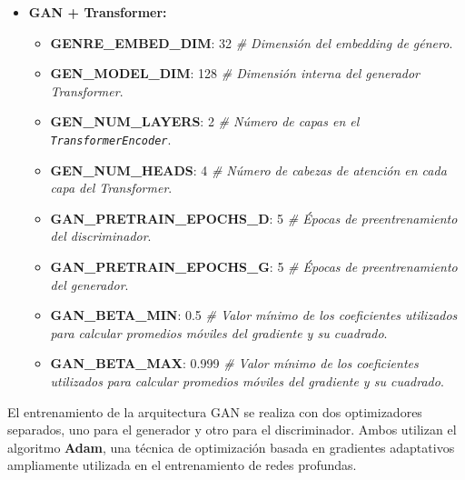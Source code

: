 \begin{itemize}
  \item \textbf{GAN + Transformer:}
  \begin{itemize}
    \item \textbf{GENRE\_EMBED\_DIM}: 32 \emph{\# Dimensión del embedding de género}.
    \item \textbf{GEN\_MODEL\_DIM}: 128 \emph{\# Dimensión interna del generador Transformer}.
    \item \textbf{GEN\_NUM\_LAYERS}: 2 \emph{\# Número de capas en el \texttt{TransformerEncoder}}.
    \item \textbf{GEN\_NUM\_HEADS}: 4 \emph{\# Número de cabezas de atención en cada capa del Transformer}.
    \item \textbf{GAN\_PRETRAIN\_EPOCHS\_D}: 5 \emph{\# Épocas de preentrenamiento del discriminador}.
    \item \textbf{GAN\_PRETRAIN\_EPOCHS\_G}: 5 \emph{\# Épocas de preentrenamiento del generador}.
    \item \textbf{GAN\_BETA\_MIN}: 0.5 \emph{\# Valor mínimo de los coeficientes utilizados para calcular promedios móviles del gradiente y su cuadrado}.
    \item \textbf{GAN\_BETA\_MAX}: 0.999 \emph{\# Valor mínimo de los coeficientes utilizados para calcular promedios móviles del gradiente y su cuadrado}.
  \end{itemize}
\end{itemize}

El entrenamiento de la arquitectura GAN se realiza con dos optimizadores separados, uno para el generador y otro para el discriminador. Ambos utilizan el algoritmo \textbf{Adam}, una técnica de optimización basada en gradientes adaptativos ampliamente utilizada en el entrenamiento de redes profundas.


